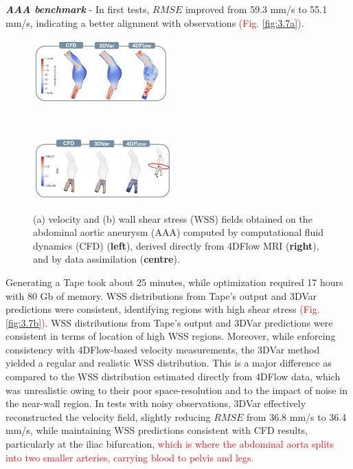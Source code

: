 \textbf{\textit{AAA benchmark}} - In first tests, \(RMSE\) improved from 59.3 mm/s to 55.1 mm/s, indicating a better alignment with observations \textcolor{red}{(Fig. \ref{fig:3.7a})}. 
\begin{figure}
    \centering
    \begin{minipage}{\textwidth}
        \centering
        \includegraphics[width=0.47\textwidth, height = 0.15\textheight]{chapters/chp1/graphics/RealData3DVar.JPG}
        \label{fig:3.7a}
    \end{minipage}
    \\[1em]  
    \begin{minipage}{\textwidth}
        \centering
        \includegraphics[width=0.47\textwidth, height = 0.15\textheight]{chapters/chp1/graphics/WSS3DVar.JPG}
        \label{fig:3.7b}
    \end{minipage}
    \caption{\small (a) velocity and (b) wall shear stress (WSS) fields obtained on the abdominal aortic aneurysm (AAA) computed by computational fluid dynamics (CFD) (\textbf{left}), derived directly from 4DFlow MRI (\textbf{right}), and by  data assimilation (\textbf{centre}).}
    \label{fig:3.7}
\end{figure}

Generating a Tape took about 25 minutes, while optimization required 17 hours with 80 Gb of memory. WSS distributions from Tape's output and 3DVar predictions were consistent, identifying regions with high shear stress \textcolor{red}{(Fig. \ref{fig:3.7b})}. WSS distributions from Tape's output and 3DVar predictions were consistent in terms of location of high WSS regions. Moreover, while enforcing consistency with 4DFlow-based velocity measurements, the 3DVar method yielded a regular and realistic WSS distribution. This is a major difference as compared to the WSS distribution estimated directly from 4DFlow data, which was unrealistic owing to their poor space-resolution and to the impact of noise in the near-wall region. In tests with noisy observations, 3DVar effectively reconstructed the velocity field, slightly reducing \(RMSE\) from 36.8 mm/s to 36.4 mm/s, while maintaining WSS predictions consistent with CFD results, particularly at the iliac bifurcation, \textcolor{red}{which is where the abdominal aorta splits into two smaller arteries, carrying blood to pelvis and legs.}


